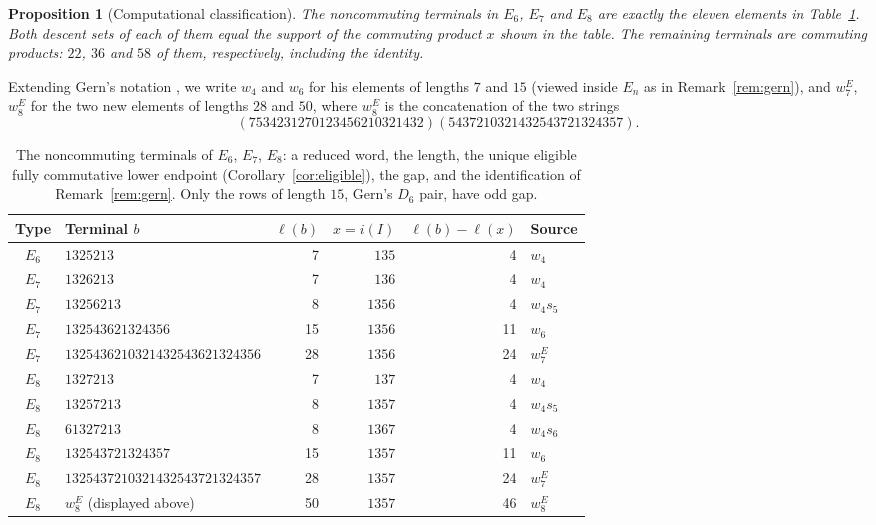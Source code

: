 \documentclass[10pt]{article}
\newtheorem{proposition}[theorem]{Proposition}
\theoremstyle{remark}
\begin{document}
\begin{proposition}[Computational classification]\label{prop:classification}
The noncommuting terminals in $E_6$, $E_7$ and $E_8$ are exactly the eleven
elements in Table~\ref{tab:terminals}. Both descent sets of each of them
equal the support of the commuting product $x$ shown in the table. The
remaining terminals are commuting products: $22$, $36$ and $58$ of them,
respectively, including the identity.
\end{proposition}
Extending Gern's notation \cite[Theorem~2.3.6]{Gern}, we write $w_4$ and
$w_6$ for his elements of lengths $7$ and $15$ (viewed inside $E_n$ as in
Remark~\ref{rem:gern}), and $w_7^{E}$, $w_8^{E}$ for the two new elements of
lengths $28$ and $50$, where $w_8^{E}$ is the concatenation of the two strings
\[
 (7534231270123456210321432)(5437210321432543721324357).
\]
\begin{table}[htbp]
\centering\small
\begin{tabular}{@{}clrrrl@{}}
\toprule
Type & Terminal $b$ & $\ell(b)$ & $x=i(I)$ & $\ell(b)-\ell(x)$ & Source\\
\midrule
$E_6$ & $1325213$ & 7 & $135$ & 4 & $w_4$\\
$E_7$ & $1326213$ & 7 & $136$ & 4 & $w_4$\\
$E_7$ & $13256213$ & 8 & $1356$ & 4 & $w_4s_5$\\
$E_7$ & $132543621324356$ & 15 & $1356$ & 11 & $w_6$\\
$E_7$ & $1325436210321432543621324356$ & 28 & $1356$ & 24 & $w_7^{E}$\\
$E_8$ & $1327213$ & 7 & $137$ & 4 & $w_4$\\
$E_8$ & $13257213$ & 8 & $1357$ & 4 & $w_4s_5$\\
$E_8$ & $61327213$ & 8 & $1367$ & 4 & $w_4s_6$\\
$E_8$ & $132543721324357$ & 15 & $1357$ & 11 & $w_6$\\
$E_8$ & $1325437210321432543721324357$ & 28 & $1357$ & 24 & $w_7^{E}$\\
$E_8$ & $w_8^{E}$ (displayed above) & 50 & $1357$ & 46 & $w_8^{E}$\\
\bottomrule
\end{tabular}
\caption{The noncommuting terminals of $E_6$, $E_7$, $E_8$: a reduced
word, the length, the unique eligible fully commutative lower endpoint
(Corollary~\ref{cor:eligible}), the gap, and the identification of
Remark~\ref{rem:gern}. Only the rows of length $15$, Gern's $D_6$ pair,
have odd gap.}
\label{tab:terminals}
\end{table}
\end{document}
